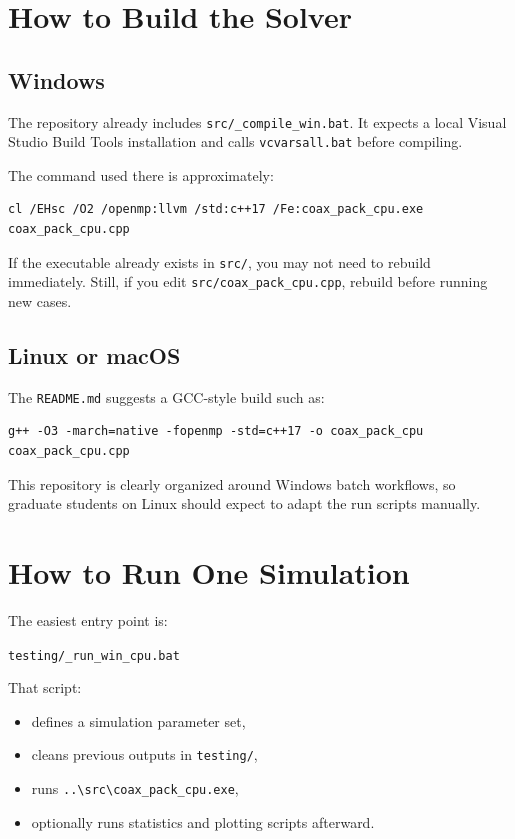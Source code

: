 \documentclass[11pt]{article}
\begin{document}
\section{How to Build the Solver}

\subsection{Windows}

The repository already includes \texttt{src/\_compile\_win.bat}. It expects a local Visual Studio Build Tools installation and calls \texttt{vcvarsall.bat} before compiling.

The command used there is approximately:
\begin{Verbatim}[fontsize=\small]
cl /EHsc /O2 /openmp:llvm /std:c++17 /Fe:coax_pack_cpu.exe coax_pack_cpu.cpp
\end{Verbatim}

If the executable already exists in \texttt{src/}, you may not need to rebuild immediately. Still, if you edit \texttt{src/coax\_pack\_cpu.cpp}, rebuild before running new cases.

\subsection{Linux or macOS}

The \texttt{README.md} suggests a GCC-style build such as:
\begin{Verbatim}[fontsize=\small]
g++ -O3 -march=native -fopenmp -std=c++17 -o coax_pack_cpu coax_pack_cpu.cpp
\end{Verbatim}

This repository is clearly organized around Windows batch workflows, so graduate students on Linux should expect to adapt the run scripts manually.

\section{How to Run One Simulation}

The easiest entry point is:
\begin{center}
\texttt{testing/\_run\_win\_cpu.bat}
\end{center}

That script:
\begin{itemize}
  \item defines a simulation parameter set,
  \item cleans previous outputs in \texttt{testing/},
  \item runs \texttt{..\textbackslash src\textbackslash coax\_pack\_cpu.exe},
  \item optionally runs statistics and plotting scripts afterward.
\end{itemize}
\end{document}
